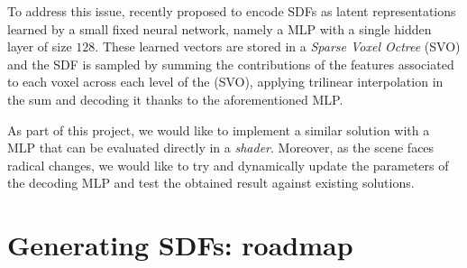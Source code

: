 \documentclass[10pt,a4paper,english, twocolumn]{article}
\begin{document}
To address this issue, \cite{takikawa2021nglod} recently proposed to encode SDFs as latent representations learned by a small fixed neural network, namely a MLP with a single hidden layer of size $128$. These learned vectors are stored in a \textit{Sparse Voxel Octree} (SVO) and the SDF is sampled by summing the contributions of the features associated to each voxel across each level of the (SVO), applying trilinear interpolation in the sum and decoding it thanks to the aforementioned MLP.

As part of this project, we would like to implement a similar solution with a MLP that can be evaluated directly in a \textit{shader}. Moreover, as the scene faces radical changes, we would like to try and dynamically update the parameters of the decoding MLP and test the obtained result against existing solutions.

\section{Generating SDFs: roadmap}



\end{document}

